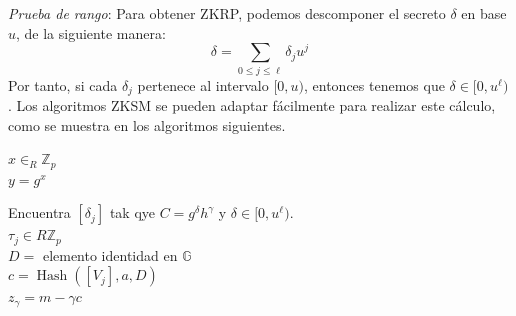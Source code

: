 \emph{Prueba de rango}: Para obtener ZKRP, podemos descomponer el secreto $\delta$ en base $u$, de la siguiente manera:
$$\delta = \sum_{0 \leq j \leq \ell} \delta_{j}u^{j}$$
Por tanto, si cada $\delta_{j}$ pertenece al intervalo $[0, u)$, entonces tenemos que $\delta \in [0, u^{\ell})$. Los algoritmos ZKSM se pueden adaptar fácilmente para realizar este cálculo, como se muestra en los algoritmos siguientes.

\begin{minipage}{1\textwidth}
    \begin{algorithm}[H]
        \caption{Prueba de rango basada en firma: $\operatorname{Setup_{ZKSM}}$ para el intervalo $[0, u^{\ell})]$}
        \KwOut{$y \in [0, u^{\ell})$ y $A \in G^{|\mathbb{Z}_{u}|}$}
        $x \in_{R} \mathbb{Z}_{p}$ \\
        $y = g^{x}$ \\
    \end{algorithm}
\end{minipage}

\begin{minipage}{1\textwidth}
    \begin{algorithm}[H]
        \caption{Prueba de rango basada en firma: $\operatorname{Prove_{ZKSM}}$ para el intervalo $[0, u^{\ell})$}
        \KwOut{$\delta, \gamma$ tal que $C = g^{\delta}h^{\gamma}$ y $\delta \in [0, u^{\ell})$}
        Encuentra $[\delta_{j}]$ tak qye $C = g^{\delta}h^{\gamma}$ y $\delta \in [0, u^{\ell})$. \\
        $\tau_{j} \in{R} \mathbb{Z}_{p}$ \\
        $D = $ elemento identidad en $\mathbb{G}$ \\
        $c = \operatorname{Hash}([V_{j}], a, D)$ \\
        $z_{\gamma} = m - \gamma c$
    \end{algorithm}
\end{minipage}

